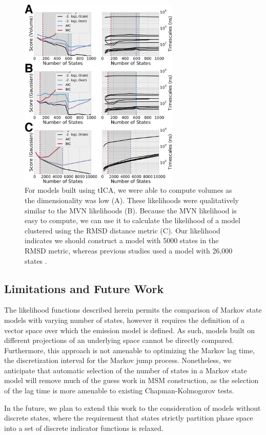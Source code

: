 \documentclass[twocolumn,floatfix,nofootinbib,aps]{revtex4-1}
\begin{document}
\begin{figure}
\centering
\includegraphics[width=3in]{figs_final/ww_likes.png}
\caption{For models built using tICA, we were able to compute volumes as the dimensionality was low (A). These likelihoods were qualitatively similar to the MVN likelihoods (B). Because the MVN likelihood is easy to compute, we can use it to calculate the likelihood of a model clustered using the RMSD distance metric (C). Our likelihood indicates we should construct a model with 5000 states in the RMSD metric, whereas previous studies used a model with 26,000 states \cite{Lane2011Markov}.}
\label{fig:ww}
\end{figure}

\subsection{Limitations and Future Work}

The likelihood functions described herein permits the comparison of Markov state models with varying number of states, however it requires the definition of a vector space over which the emission model is defined. As such, models built on different projections of an underlying space cannot be directly compared. Furthermore, this approach is not amenable to optimizing the Markov lag time, the discretization interval for the Markov jump process. Nonetheless, we anticipate that automatic selection of the number of states in a Markov state model will remove much of the guess work in MSM construction, as the selection of the lag time is more amenable to existing Chapman-Kolmogorov tests.

In the future, we plan to extend this work to the consideration of models without discrete states, where the requirement that states strictly partition phase space into a set of discrete indicator functions is relaxed.
\end{document}
